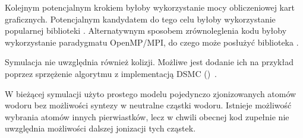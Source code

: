 Kolejnym potencjalnym krokiem byłoby wykorzystanie mocy obliczeniowej kart graficznych. Potencjalnym kandydatem do tego celu byłoby wykorzystanie popularnej biblioteki .
Alternatywnym sposobem zrównoleglenia kodu byłoby wykorzystanie paradygmatu OpenMP/MPI, do czego może posłużyć biblioteka .

Symulacja nie uwzględnia również kolizji. Możliwe jest dodanie ich na przykład poprzez sprzężenie algorytmu z implementacją DSMC ()~\cite{particleincell-dmsc}. %

W bieżącej symulacji użyto prostego modelu pojedynczo zjonizowanych atomów wodoru bez możliwości syntezy w neutralne cząstki wodoru. Istnieje możliwość wybrania atomów innych pierwiastków,
lecz w chwili obecnej kod zupełnie nie uwzględnia możliwości dalszej jonizacji tych cząstek.










